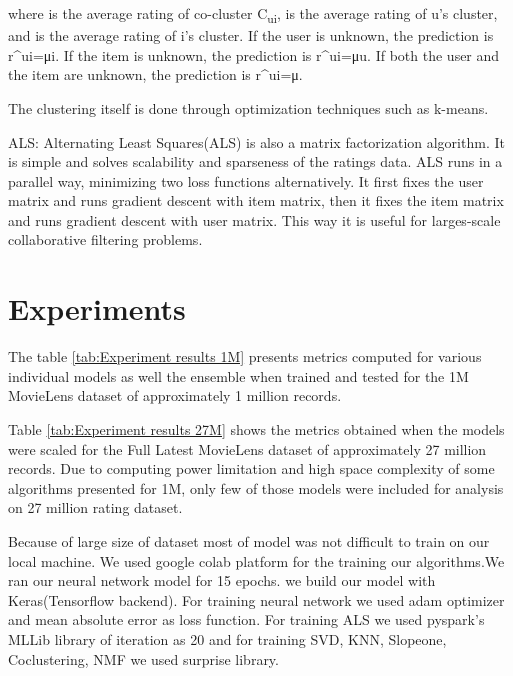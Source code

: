 \documentclass[sigconf]{acmart}
\begin{document}
where \beginmath{}\endmath{} is the average rating of co-cluster C\textsubscript{ui}, \beginmath{}\endmath{} is the average rating of u’s cluster, and \beginmath{}\endmath{} is the average rating of i’s cluster. If the user is unknown, the prediction is \beginmath{}r^ui=μi\endmath{}. If the item is unknown, the prediction is \beginmath{}r^ui=μu\endmath{}. If both the user and the item are unknown, the prediction is \beginmath{}r^ui=μ\endmath{}.

The clustering itself is done through optimization techniques such as k-means.

ALS: Alternating Least Squares(ALS) is also a matrix factorization algorithm. It is simple and solves scalability and sparseness of the ratings data. ALS runs in a parallel way, minimizing two loss functions alternatively. It first fixes the user matrix and runs gradient descent with item matrix, then it fixes the item matrix and runs gradient descent with user matrix. This way it is useful for larges-scale collaborative filtering problems\cite{als}. 

\section{Experiments}\label{sec:experiments}
The table \ref{tab:Experiment results 1M} presents metrics computed for various individual models as well the ensemble when trained and tested for the 1M MovieLens dataset of approximately 1 million records.

Table \ref{tab:Experiment results 27M} shows the metrics obtained when the models were scaled for the Full Latest MovieLens dataset of approximately 27 million records. Due to computing power limitation and high space complexity of some algorithms presented for 1M, only few of those models were included for analysis on 27 million rating dataset.




Because of large size of dataset most of model was not difficult to train on our local machine. We used google colab platform for the training our algorithms.We ran our neural network model for 15 epochs. we build our model with Keras(Tensorflow backend). For training neural network we used adam optimizer and mean absolute error as loss function. For training ALS we used pyspark's MLLib library of iteration as 20 and for training SVD, KNN, Slopeone, Coclustering, NMF we used surprise library.
\end{document}
